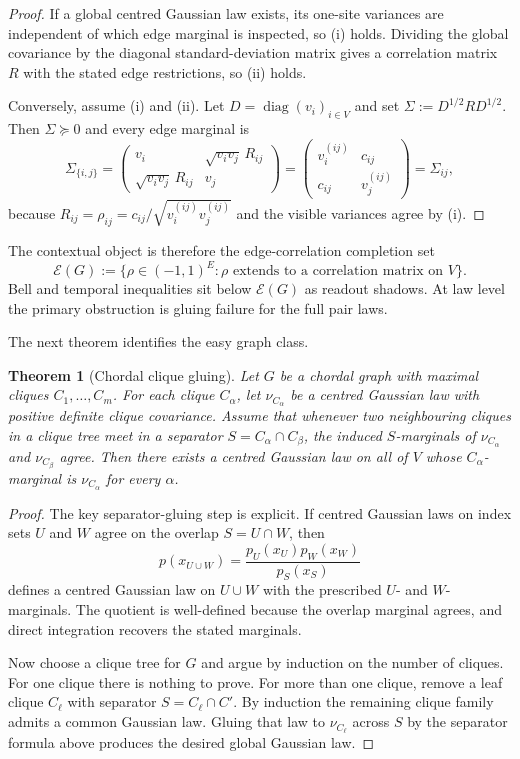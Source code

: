 \documentclass[11pt]{article}
\numberwithin{equation}{section}
\theoremstyle{thmcompact}
\newtheorem{theorem}{Theorem}[section]
\theoremstyle{remark}
\begin{document}
\begin{proof}
If a global centred Gaussian law exists, its one-site variances are independent of which edge marginal is inspected, so \textup{(i)} holds. Dividing the global covariance by the diagonal standard-deviation matrix gives a correlation matrix $R$ with the stated edge restrictions, so \textup{(ii)} holds.

Conversely, assume \textup{(i)} and \textup{(ii)}. Let $D=\operatorname{diag}(v_i)_{i\in V}$ and set $\Sigma:=D^{1/2}RD^{1/2}$. Then $\Sigma\succeq0$ and every edge marginal is
\[
\Sigma_{\{i,j\}}=\begin{pmatrix}
v_i & \sqrt{v_iv_j}\,R_{ij}\\
\sqrt{v_iv_j}\,R_{ij} & v_j
\end{pmatrix}
=\begin{pmatrix}
v_i^{(ij)} & c_{ij}\\ c_{ij} & v_j^{(ij)}
\end{pmatrix}
=\Sigma_{ij},
\]
because $R_{ij}=\rho_{ij}=c_{ij}/\sqrt{v_i^{(ij)}v_j^{(ij)}}$ and the visible variances agree by \textup{(i)}.
\end{proof}

The contextual object is therefore the edge-correlation completion set
\[
\mathcal E(G):=\{\rho\in(-1,1)^E:\rho\text{ extends to a correlation matrix on }V\}.
\]
Bell and temporal inequalities sit below $\mathcal E(G)$ as readout shadows. At law level the primary obstruction is gluing failure for the full pair laws.

The next theorem identifies the easy graph class.

\begin{theorem}[Chordal clique gluing]\label{thm:chordal-gluing}
Let $G$ be a chordal graph with maximal cliques $C_1,\dots,C_m$. For each clique $C_\alpha$, let $\nu_{C_\alpha}$ be a centred Gaussian law with positive definite clique covariance. Assume that whenever two neighbouring cliques in a clique tree meet in a separator $S=C_\alpha\cap C_\beta$, the induced $S$-marginals of $\nu_{C_\alpha}$ and $\nu_{C_\beta}$ agree. Then there exists a centred Gaussian law on all of $V$ whose $C_\alpha$-marginal is $\nu_{C_\alpha}$ for every $\alpha$.
\end{theorem}

\begin{proof}
The key separator-gluing step is explicit. If centred Gaussian laws on index sets $U$ and $W$ agree on the overlap $S=U\cap W$, then
\[
p(x_{U\cup W})=\frac{p_U(x_U)p_W(x_W)}{p_S(x_S)}
\]
defines a centred Gaussian law on $U\cup W$ with the prescribed $U$- and $W$-marginals. The quotient is well-defined because the overlap marginal agrees, and direct integration recovers the stated marginals.

Now choose a clique tree for $G$ and argue by induction on the number of cliques. For one clique there is nothing to prove. For more than one clique, remove a leaf clique $C_\ell$ with separator $S=C_\ell\cap C'$. By induction the remaining clique family admits a common Gaussian law. Gluing that law to $\nu_{C_\ell}$ across $S$ by the separator formula above produces the desired global Gaussian law.
\end{proof}
\end{document}
